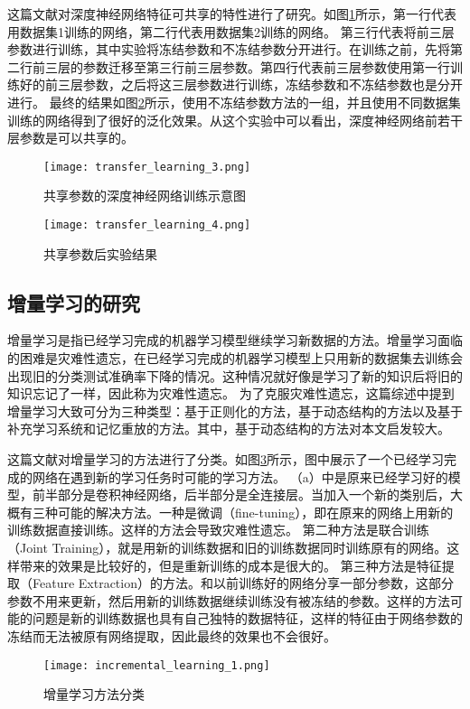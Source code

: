 这篇文献\cite{yosinski_2014_NIPS}对深度神经网络特征可共享的特性进行了研究。如图\ref{fig:transfer_learning_3}所示，第一行代表用数据集1训练的网络，第二行代表用数据集2训练的网络。
第三行代表将前三层参数进行训练，其中实验将冻结参数和不冻结参数分开进行。在训练之前，先将第二行前三层的参数迁移至第三行前三层参数。第四行代表前三层参数使用第一行训练好的前三层参数，之后将这三层参数进行训练，冻结参数和不冻结参数也是分开进行。
最终的结果如图\ref{fig:transfer_learning_4}所示，使用不冻结参数方法的一组，并且使用不同数据集训练的网络得到了很好的泛化效果。从这个实验中可以看出，深度神经网络前若干层参数是可以共享的。
\begin{figure}
    \centering
    \texttt{[image: transfer\_learning\_3.png]}
    \caption{共享参数的深度神经网络训练示意图\cite{yosinski_2014_NIPS}}
    \label{fig:transfer_learning_3}
\end{figure}
\begin{figure}
    \centering
    \texttt{[image: transfer\_learning\_4.png]}
    \caption{共享参数后实验结果\cite{yosinski_2014_NIPS}}
    \label{fig:transfer_learning_4}
\end{figure}

\subsection{增量学习的研究}
增量学习是指已经学习完成的机器学习模型继续学习新数据的方法。增量学习面临的困难是灾难性遗忘，在已经学习完成的机器学习模型上只用新的数据集去训练会出现旧的分类测试准确率下降的情况。这种情况就好像是学习了新的知识后将旧的知识忘记了一样，因此称为灾难性遗忘。
为了克服灾难性遗忘，这篇综述\cite{PARISI201954}中提到增量学习大致可分为三种类型：基于正则化的方法，基于动态结构的方法以及基于补充学习系统和记忆重放的方法。其中，基于动态结构的方法对本文启发较大。

这篇文献\cite{8107520}对增量学习的方法进行了分类。如图\ref{fig:incremental_learning_1}所示，图中展示了一个已经学习完成的网络在遇到新的学习任务时可能的学习方法。
（a）中是原来已经学习好的模型，前半部分是卷积神经网络，后半部分是全连接层。当加入一个新的类别后，大概有三种可能的解决方法。一种是微调（fine-tuning），即在原来的网络上用新的训练数据直接训练。这样的方法会导致灾难性遗忘。
第二种方法是联合训练（Joint Training），就是用新的训练数据和旧的训练数据同时训练原有的网络。这样带来的效果是比较好的，但是重新训练的成本是很大的。
第三种方法是特征提取（Feature Extraction）的方法。和以前训练好的网络分享一部分参数，这部分参数不用来更新，然后用新的训练数据继续训练没有被冻结的参数。这样的方法可能的问题是新的训练数据也具有自己独特的数据特征，这样的特征由于网络参数的冻结而无法被原有网络提取，因此最终的效果也不会很好。
\begin{figure}
    \centering
    \texttt{[image: incremental\_learning\_1.png]}
    \caption{增量学习方法分类\cite{8107520}}
    \label{fig:incremental_learning_1}
\end{figure}

